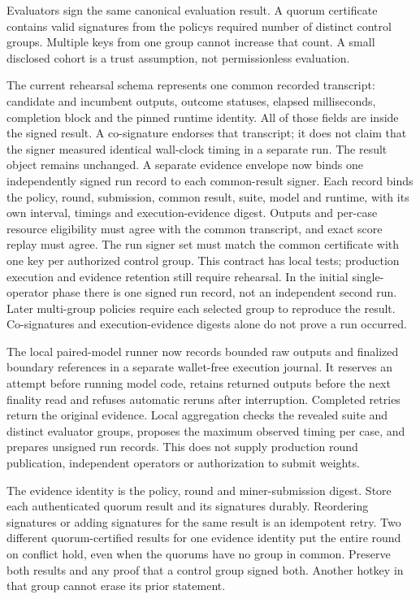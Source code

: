 Evaluators sign the same canonical evaluation result. A quorum certificate
contains valid signatures from the policy\textquotesingle s required number of distinct
control groups. Multiple keys from one group cannot increase that count.
A small disclosed cohort is a trust assumption, not permissionless evaluation.

The current rehearsal schema represents one common recorded transcript:
candidate and incumbent outputs, outcome statuses, elapsed milliseconds,
completion block and the pinned runtime identity. All of those fields are
inside the signed result. A co-signature endorses that transcript; it does not
claim that the signer measured identical wall-clock timing in a separate run.
The result object remains unchanged. A separate evidence envelope now binds
one independently signed run record to each common-result signer. Each record
binds the policy, round, submission, common result, suite, model and runtime,
with its own interval, timings and execution-evidence digest. Outputs and
per-case resource eligibility must agree with the common transcript, and exact
score replay must agree. The run signer set must match the common certificate
with one key per authorized control group. This contract has local tests;
production execution and evidence retention still require rehearsal. In the
initial single-operator phase there is one signed run record, not an independent
second run. Later multi-group policies require each selected group to reproduce
the result.
Co-signatures and execution-evidence digests alone do not prove a run occurred.

The local paired-model runner now records bounded raw outputs and finalized
boundary references in a separate wallet-free execution journal. It reserves an
attempt before running model code, retains returned outputs before the next
finality read and refuses automatic reruns after interruption. Completed retries
return the original evidence. Local aggregation checks the revealed suite and
distinct evaluator groups, proposes the maximum observed timing per case, and
prepares unsigned run records. This does not supply production round
publication, independent operators or authorization to submit weights.

The evidence identity is the policy, round and miner-submission digest.
Store each authenticated quorum result and its signatures durably. Reordering
signatures or adding signatures for the same result is an idempotent retry.
Two different quorum-certified results for one evidence identity put the
entire round on conflict hold, even when the quorums have no group in common.
Preserve both results and any proof that a control group signed both.
Another hotkey in that group cannot erase its prior statement.

